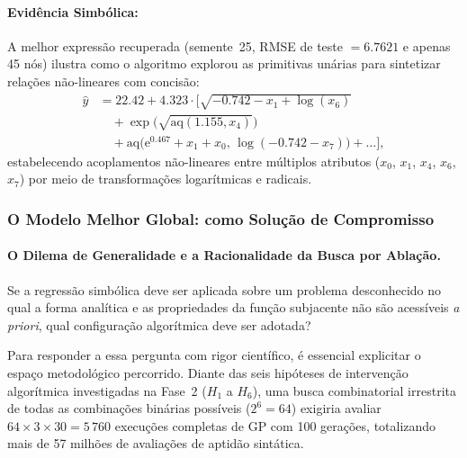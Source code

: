 \paragraph{Evidência Simbólica:}
A melhor expressão recuperada (semente~25, RMSE de teste $= \mathbf{6.7621}$ e
apenas 45 nós) ilustra como o algoritmo explorou as primitivas unárias para
sintetizar relações não-lineares com concisão:
\begin{equation}
\begin{split}
  \hat{y} &= 22.42 + 4.323 \cdot \Big[ \sqrt{-0.742 - x_1 + \log(x_6)} \\
          &\quad + \exp\big(\sqrt{\mathrm{aq}(1.155, x_4)}\big) \\
          &\quad + \mathrm{aq}\big(\mathrm{e}^{0.467} + x_1 + x_0, \, \log(-0.742 - x_7)\big) + \dots \Big],
\end{split}
\end{equation}
estabelecendo acoplamentos não-lineares entre múltiplos atributos
($x_0$, $x_1$, $x_4$, $x_6$, $x_7$) por meio de transformações logarítmicas e radicais.

\subsubsection{O Modelo Melhor Global:  como Solução de Compromisso}
\label{sec:melhor_global}

\paragraph{O Dilema de Generalidade e a Racionalidade da Busca por Ablação.}
Se a regressão simbólica deve ser aplicada sobre um problema desconhecido no qual
a forma analítica e as propriedades da função subjacente não são acessíveis
\emph{a priori}, qual configuração algorítmica deve ser adotada?

Para responder a essa pergunta com rigor científico, é essencial explicitar o
espaço metodológico percorrido. Diante das seis hipóteses de intervenção
algorítmica investigadas na Fase~2 ($H_1$ a $H_6$), uma busca combinatorial
irrestrita de todas as combinações binárias possíveis ($2^6 = 64$) exigiria
avaliar $64 \times 3 \times 30 = 5\,760$ execuções completas de GP com 100 gerações,
totalizando mais de 57 milhões de avaliações de aptidão sintática.

